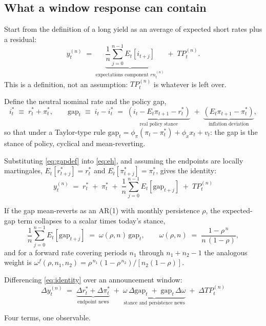 \subsection{What a window response can contain}
\label{sec:framework}

Start from the definition of a long yield as an average of expected short rates plus a residual:
\begin{equation}
y^{(n)}_t \;=\; \underbrace{\frac{1}{n}\sum_{j=0}^{n-1} E_t\!\left[i_{t+j}\right]}_{\text{expectations component } rn^{(n)}_t} \;+\; TP^{(n)}_t .
\label{eq:eh}
\end{equation}
This is a definition, not an assumption: $TP^{(n)}_t$ is whatever is left over.

Define the neutral nominal rate and the policy gap,
\begin{equation}
i^{*}_t \;\equiv\; r^{*}_t + \pi^{*}_t ,
\qquad
\text{gap}_t \;\equiv\; i_t - i^{*}_t
\;=\; \underbrace{\left(i_t - E_t\pi_{t+1} - r^{*}_t\right)}_{\text{real policy stance}}
\;+\; \underbrace{\left(E_t\pi_{t+1} - \pi^{*}_t\right)}_{\text{inflation deviation}} ,
\label{eq:gapdef}
\end{equation}
so that under a Taylor-type rule
$\text{gap}_t = \phi_\pi(\pi_t-\pi^{*}_t) + \phi_x x_t + v_t$: the gap is the stance of policy,
cyclical and mean-reverting.

Substituting \eqref{eq:gapdef} into \eqref{eq:eh}, and assuming the endpoints are locally
martingales, $E_t[r^{*}_{t+j}] = r^{*}_t$ and $E_t[\pi^{*}_{t+j}] = \pi^{*}_t$, gives the
identity:
\begin{equation}
\boxed{\;
y^{(n)}_t \;=\; r^{*}_t \;+\; \pi^{*}_t \;+\; \frac{1}{n}\sum_{j=0}^{n-1} E_t\!\left[\text{gap}_{t+j}\right] \;+\; TP^{(n)}_t \;}
\label{eq:identity}
\end{equation}

If the gap mean-reverts as an AR(1) with monthly persistence $\rho$, the expected-gap term
collapses to a scalar times today's stance,
\begin{equation}
\frac{1}{n}\sum_{j=0}^{n-1} E_t\!\left[\text{gap}_{t+j}\right] \;=\; \omega(\rho,n)\,\text{gap}_t ,
\qquad
\omega(\rho,n) \;=\; \frac{1-\rho^{\,n}}{n\,(1-\rho)} ,
\label{eq:omega}
\end{equation}
and for a forward rate covering periods $n_1$ through $n_1+n_2-1$ the analogous weight is
$\omega^{f}(\rho,n_1,n_2) = \rho^{\,n_1}\left(1-\rho^{\,n_2}\right)\big/\left[n_2(1-\rho)\right]$.

Differencing \eqref{eq:identity} over an announcement window:
\begin{equation}
\boxed{\;
\Delta y^{(n)}_t \;=\;
\underbrace{\Delta r^{*}_t + \Delta \pi^{*}_t}_{\text{endpoint news}}
\;+\; \underbrace{\omega\,\Delta\text{gap}_t \;+\; \text{gap}_t\,\Delta\omega}_{\text{stance and persistence news}}
\;+\; \Delta TP^{(n)}_t \;}
\label{eq:windowdiff}
\end{equation}

\noindent Four terms, one observable.
